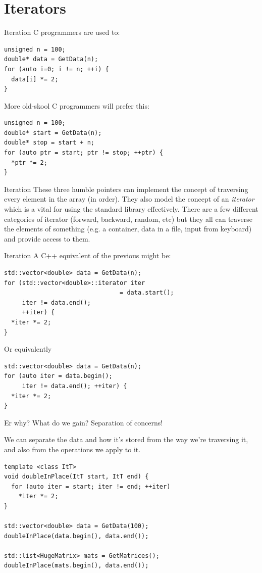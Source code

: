 \documentclass[presentation,t]{beamer}
\newcommand{\code}[1]{\lstinline!#1!}
\begin{document}
\section{Iterators}
\begin{frame}[fragile]{Iteration}
C programmers are used to:
\begin{lstlisting}
unsigned n = 100;
double* data = GetData(n);
for (auto i=0; i != n; ++i) {
  data[i] *= 2;
}
\end{lstlisting}

More old-skool C programmers will prefer this:
\begin{lstlisting}
unsigned n = 100;
double* start = GetData(n);
double* stop = start + n;
for (auto ptr = start; ptr != stop; ++ptr) {
  *ptr *= 2;
}
\end{lstlisting}
\end{frame}
\begin{frame}{Iteration}
These three humble pointers can implement the concept of traversing
every element in the array (in order).
\vfill
They also model the concept of an \emph{iterator} which is a vital for
using the standard library effectively.
\vfill
There are a few different categories of iterator (forward, backward,
random, etc) but they all can traverse the elements of something
(e.g. a container, data in a file, input from keyboard) and provide
access to them.
\end{frame}

\begin{frame}[fragile]{Iteration}
  A C++ equivalent of the previous might be:
\begin{lstlisting}
std::vector<double> data = GetData(n);
for (std::vector<double>::iterator iter 
                                = data.start();
     iter != data.end();
     ++iter) {
  *iter *= 2;
}
\end{lstlisting}
\pause
Or equivalently
\begin{lstlisting}
std::vector<double> data = GetData(n);
for (auto iter = data.begin();
     iter != data.end(); ++iter) {
  *iter *= 2;
}
\end{lstlisting}

\end{frame}

\begin{frame}[fragile]{Er why?}
  What do we gain? \pause Separation of concerns!

  We can separate the data and how it's stored from the way we're
  traversing it, and also from the operations we apply to it.

  \pause
\begin{lstlisting}
template <class ItT>
void doubleInPlace(ItT start, ItT end) {
  for (auto iter = start; iter != end; ++iter)
    *iter *= 2;
}

std::vector<double> data = GetData(100);
doubleInPlace(data.begin(), data.end());

std::list<HugeMatrix> mats = GetMatrices();
doubleInPlace(mats.begin(), data.end());

\end{lstlisting}
\end{frame}
\end{document}
